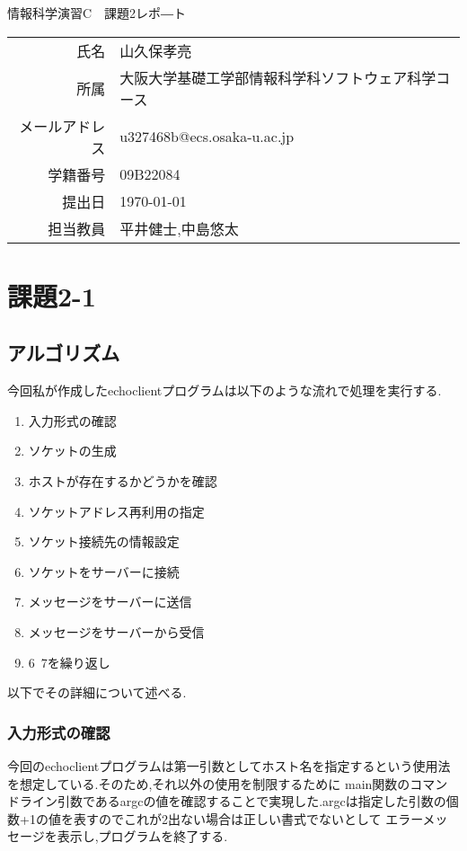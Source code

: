 \documentclass[dvipdfmx]{jarticle}
\begin{document}
\begin{titlepage}
    \begin{center}
        {\huge 情報科学演習C　課題2レポ―ト}
        \vspace{180pt}\\
        \begin{tabular}{rl}
            氏名 & 山久保孝亮\\
            所属 & 大阪大学基礎工学部情報科学科ソフトウェア科学コース\\
            メールアドレス & u327468b@ecs.osaka-u.ac.jp\\
            学籍番号 & 09B22084\\
            提出日 & \today\\
            担当教員 & 平井健士,中島悠太
        \end{tabular}
    \end{center}
\end{titlepage}
\section{課題2-1}
\subsection{アルゴリズム}
今回私が作成したechoclientプログラムは以下のような流れで処理を実行する.

\begin{enumerate}
    \item 入力形式の確認
    \item ソケットの生成
    \item ホストが存在するかどうかを確認
    \item ソケットアドレス再利用の指定
    \item ソケット接続先の情報設定
    \item ソケットをサーバーに接続
    \item メッセージをサーバーに送信
    \item メッセージをサーバーから受信
    \item 6~7を繰り返し
\end{enumerate}
以下でその詳細について述べる.
\subsubsection{入力形式の確認}
今回のechoclientプログラムは第一引数としてホスト名を指定するという使用法を想定している.そのため,それ以外の使用を制限するために
main関数のコマンドライン引数であるargcの値を確認することで実現した.argcは指定した引数の個数+1の値を表すのでこれが2出ない場合は正しい書式でないとして
エラーメッセージを表示し,プログラムを終了する.
\end{document}

